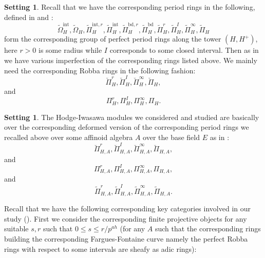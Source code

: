 \documentclass[12pt]{amsart}
\theoremstyle{definition}
\numberwithin{equation}{section}
\newtheorem{setting}[theorem]{Setting}
\begin{document}
\begin{setting}
Recall that we have the corresponding period rings in the following, defined in \cite{KL15} and \cite{KL16}:
\begin{displaymath}
\widetilde{\Omega}_H^\mathrm{int},\widetilde{\Omega}_H,\widetilde{\Pi}_H^{\mathrm{int},r},	\widetilde{\Pi}_H^{\mathrm{int}},\widetilde{\Pi}_H^{\mathrm{bd},r},	\widetilde{\Pi}_H^{\mathrm{bd}},\widetilde{\Pi}_H^{r},	\widetilde{\Pi}_H^{I},\widetilde{\Pi}_H^\infty,	\widetilde{\Pi}_H
\end{displaymath}
form the corresponding group of perfect period rings along the tower $(H,H^+)$, here $r>0$ is some radius while $I$ corresponds to some closed interval. Then as in \cite[Definition 5.2.1]{KL16} we have various imperfection of the corresponding rings listed above. We mainly need the corresponding Robba rings in the following fashion:
\begin{displaymath}
\breve{\Pi}_H^{r},	\breve{\Pi}_H^{I},\breve{\Pi}_H^\infty,	\breve{\Pi}_H,	
\end{displaymath}
and 
\begin{displaymath}
{\Pi}_H^{r},	{\Pi}_H^{I}, \Pi_H^\infty,	{\Pi}_H.	
\end{displaymath}
\end{setting}


\begin{setting}
The Hodge-Iwasawa modules we considered and studied are basically over the corresponding deformed version of the corresponding period rings we recalled above over some affinoid algebra $A$ over the base field $E$ as in \cite{XT2}:
\begin{displaymath}
\breve{\Pi}_{H,A}^{r},	\breve{\Pi}_{H,A}^{I},\breve{\Pi}_{H,A}^\infty,	\breve{\Pi}_{H,A},	
\end{displaymath}
and 
\begin{displaymath}
{\Pi}_{H,A}^{r},	{\Pi}_{H,A}^{I}, \Pi_{H,A}^\infty,	{\Pi}_{H,A},	
\end{displaymath}	
and
\begin{displaymath}
\widetilde{\Pi}_{H,A}^{r},	\widetilde{\Pi}_{H,A}^{I},\widetilde{\Pi}_{H,A}^\infty,	\widetilde{\Pi}_{H,A}.
\end{displaymath}


\end{setting}




	
	
\indent Recall that we have the following corresponding key categories involved in our study (\cite{XT2}). First we consider the corresponding finite projective objects for any suitable $s,r$ such that $0\leq s\leq r/p^{ah}$ (for any $A$ such that the corresponding rings building the corresponding Fargues-Fontaine curve namely the perfect Robba rings with respect to some intervals are sheafy as adic rings):
\end{document}
